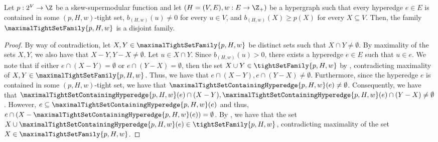 \begin{lemma}\label{lem:weak-to-strong:uncrossing:maximal-tight-set-family-disjoint}
    Let $p:2^V\rightarrow\Z$ be a skew-supermodular function and let $\left(H = (V, E), w:E \rightarrow\Z_+\right)$ be a hypergraph 
    such that every hyperedge $e \in E$ is contained in some $(p, H, w)$-tight set, $b_{(H,w)}(u) \not = 0$ for every $u \in V$, and $b_{(H,w)}(X) \geq p(X)$ for every $X \subseteq V$. 
    Then, the family $\maximalTightSetFamily{p, H, w}$ is a disjoint family.
\end{lemma}
\begin{proof}
By way of contradiction, let $X, Y \in \maximalTightSetFamily{p, H, w}$ be distinct sets such that $X\cap Y \not = \emptyset$. By maximality of the sets $X, Y$, we also have that $X - Y, Y - X \not = \emptyset$. Let $u \in X\cap Y$. Since $b_{(H,w)}(u) > 0$, there exists a hyperedge $e \in E$ such that $u \in e$. We note that if either $e\cap (X - Y) = \emptyset$ or $e\cap (Y - X) = \emptyset$, then the set $X \cup Y \in \tightSetFamily{p, H, w}$ by , contradicting maximality of $X, Y \in \maximalTightSetFamily{p, H, w}$. Thus, we have that $e \cap (X - Y), e \cap (Y - X) \not= \emptyset$. Furthermore, since the hyperedge $e$ is contained in some $(p, H, w)$-tight set, we have that  $\maximalTightSetContainingHyperedge{p, H, w}(e) \not = \emptyset$. Consequently, we have that $\maximalTightSetContainingHyperedge{p, H, w}(e)\cap (X - Y), \maximalTightSetContainingHyperedge{p, H, w}(e) \cap (Y - X) \not = \emptyset$. However, $e \subseteq \maximalTightSetContainingHyperedge{p, H, w}(e)$ and thus, $e \cap (X - \maximalTightSetContainingHyperedge{p, H, w}(e)) = \emptyset$. By , we have that the set $X \cup \maximalTightSetContainingHyperedge{p, H, w}(e) \in \tightSetFamily{p, H, w}$, contradicting maximality of the set $X \in \maximalTightSetFamily{p, H, w}$.
\end{proof}

